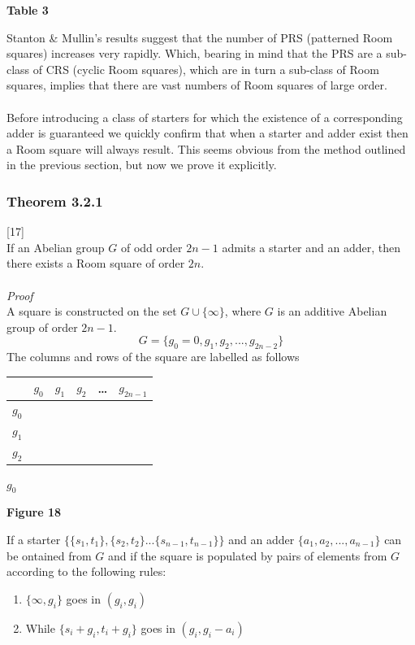\documentclass[
  12pt,
  a4paper]{book}
\begin{document}
\textbf{Table 3}

Stanton \& Mullin's results suggest that the number of PRS (patterned
Room squares) increases very rapidly. Which, bearing in mind that the
PRS are a sub-class of CRS (cyclic Room squares), which are in turn a
sub-class of Room squares, implies that there are vast numbers of Room
squares of large order.\\
~\\
Before introducing a class of starters for which the existence of a
corresponding adder is guaranteed we quickly confirm that when a starter
and adder exist then a Room square will always result. This seems
obvious from the method outlined in the previous section, but now we
prove it explicitly.

\hypertarget{theorem-3.2.1}{%
\subsubsection{Theorem 3.2.1}\label{theorem-3.2.1}}

{[}17{]}\\
If an Abelian group \(G\) of odd order \(2n-1\) admits a starter and an
adder, then there exists a Room square of order \(2n\).\\
~\\
\emph{Proof}\\
A square is constructed on the set \(G \cup \{\infty\}\), where \(G\) is an
additive Abelian group of order \(2n-1\).
\[G=\{g_0=0,g_1,g_2,...,g_{2n-2}\}\] The columns and rows of the square
are labelled as follows

\begin{longtable}[]{@{}lccccc@{}}
\toprule
& \(g_0\) & \(g_1\) & \(g_2\) & \ldots{} & \(g_{2n-1}\)\tabularnewline
\midrule
\endhead
\(g_0\) & & & & &\tabularnewline
\(g_1\) & & & & &\tabularnewline
\(g_2\) & & & & &\tabularnewline
\bottomrule
\end{longtable}

\(g_0\)

\textbf{Figure 18}

If a starter \(\{\{s_1,t_1\},\{s_2,t_2\}...\{s_{n-1},t_{n-1}\}\}\) and an
adder \(\{a_1,a_2,...,a_{n-1}\}\) can be ontained from \(G\) and if the
square is populated by pairs of elements from \(G\) according to the
following rules:

\begin{enumerate}
\def\labelenumi{\arabic{enumi}.}
\item
  \(\{\infty,g_i\}\) goes in \((g_i,g_i)\)
\item
  While \(\{s_i+g_i,t_i+g_i\}\) goes in \((g_i,g_i-a_i)\)
\end{enumerate}
\end{document}
